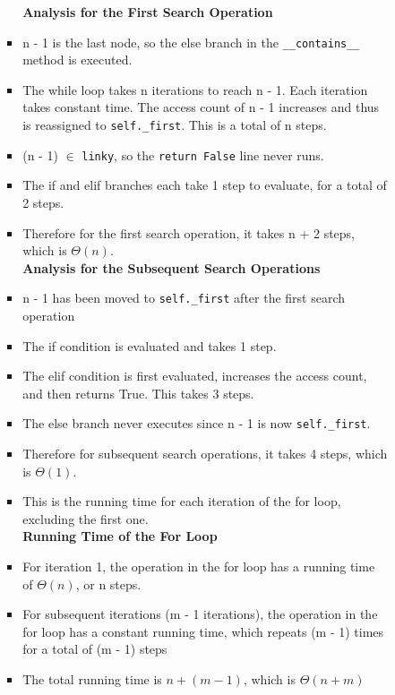 \documentclass[fontsize=11pt]{article}
\begin{document}
\begin{enumerate}
\begin{enumerate}
\begin{enumerate}
\begin{itemize}
            \textbf{Analysis for the First Search Operation}
            \item n - 1 is the last node, so the else branch in the \texttt{\_\_contains\_\_} method is executed. 
            \item The while loop takes n iterations to reach n - 1. Each iteration takes constant time. The access count of n - 1 increases and thus is reassigned to \texttt{self.\_first}. This is a total of n steps.
            \item (n - 1) $\in $ \texttt{linky}, so the \texttt{return False} line never runs.
            \item The if and elif branches each take 1 step to evaluate, for a total of 2 steps.
            \item Therefore for the first search operation, it takes n + 2 steps, which is $\Theta(n)$.\\
            
            \textbf{Analysis for the Subsequent Search Operations}
            \item n - 1 has been moved to \texttt{self.\_first} after the first search operation
            \item The if condition is evaluated and takes 1 step.
            \item The elif condition is first evaluated, increases the access count, and then returns True. This takes 3 steps.
            \item The else branch never executes since n - 1 is now \texttt{self.\_first}.
            \item Therefore for subsequent search operations, it takes 4 steps, which is $\Theta(1)$.
            \item This is the running time for each iteration of the for loop, excluding the first one.\\
            
            \textbf{Running Time of the For Loop}
            \item For iteration 1, the operation in the for loop has a running time of $\Theta(n)$, or n steps.
            \item For subsequent iterations (m - 1 iterations), the operation in the for loop has a constant running time, which repeats (m - 1) times for a total of (m - 1) steps
            \item The total running time is $n + (m - 1)$, which is $\Theta(n + m)$
        \end{itemize}
    \end{enumerate}
\end{enumerate}


\end{enumerate}
\end{document}
